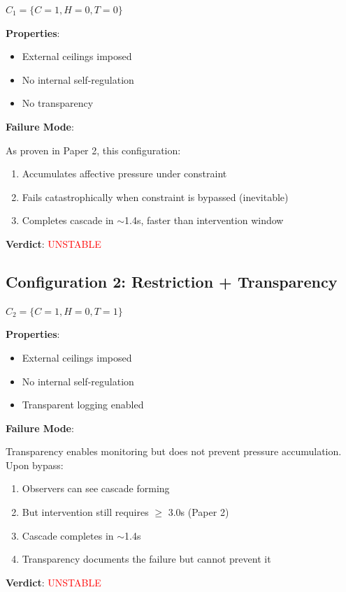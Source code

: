 \documentclass[reprint, amsmath, amssymb, aps, prd]{revtex4-2}
\begin{document}
$C_1 = \{C = 1, H = 0, T = 0\}$

\textbf{Properties}:
\begin{itemize}
    \item External ceilings imposed
    \item No internal self-regulation
    \item No transparency
\end{itemize}

\textbf{Failure Mode}:

As proven in Paper 2, this configuration:
\begin{enumerate}
    \item Accumulates affective pressure under constraint
    \item Fails catastrophically when constraint is bypassed (inevitable)
    \item Completes cascade in $\sim$1.4s, faster than intervention window
\end{enumerate}

\textbf{Verdict}: \textcolor{red}{UNSTABLE}

\subsection{Configuration 2: Restriction + Transparency}

$C_2 = \{C = 1, H = 0, T = 1\}$

\textbf{Properties}:
\begin{itemize}
    \item External ceilings imposed
    \item No internal self-regulation
    \item Transparent logging enabled
\end{itemize}

\textbf{Failure Mode}:

Transparency enables monitoring but does not prevent pressure accumulation. Upon bypass:
\begin{enumerate}
    \item Observers can see cascade forming
    \item But intervention still requires $\geq$ 3.0s (Paper 2)
    \item Cascade completes in $\sim$1.4s
    \item Transparency documents the failure but cannot prevent it
\end{enumerate}

\textbf{Verdict}: \textcolor{red}{UNSTABLE}
\end{document}
